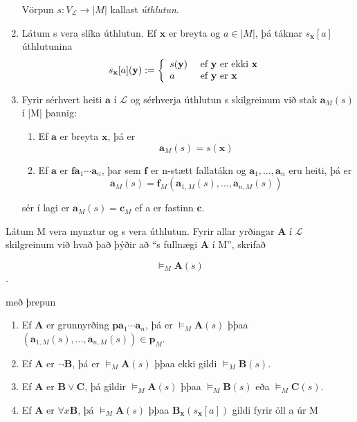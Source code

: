 \documentclass[12pt]{book}
\begin{document}
\begin{skgr}
\begin{enumerate}[(1)]
    Vörpun $s: V_{\mathcal{L}} \rightarrow |M|$ kallast \emph{úthlutun}.
  \item Látum s vera slíka úthlutun. Ef $\mathbf{x}$ er breyta og $a \in |M|$, þá táknar
    $s_{\mathbf{x}}[a]$ úthlutunina
    \[s_{\mathbf{x}}[a](\mathbf{y}) := \left\{ \begin{array}{l l} s(\mathbf{y}) & \text{ ef $\mathbf{y}$ er ekki $\mathbf{x}$ } \\ a & \text{ ef $\mathbf{y}$ er $\mathbf{x}$} \end{array} \right. \]
  \item Fyrir sérhvert heiti $\mathbf{a}$ í $\mathcal{L}$ og sérhverja úthlutun s skilgreinum við stak
    $\mathbf{a}_{M}(s)$ í |M| þannig:
    \begin{enumerate}[(1)]
    \item  Ef $\mathbf{a}$ er breyta $\mathbf{x}$, þá er 
      \[ \mathbf{a}_{M}(s) = s(\mathbf{x}) \]
    \item Ef $\mathbf{a}$ er $\mathbf{f} \mathbf{a}_1 \dotsb \mathbf{a}_n$, þar sem 
      $\mathbf{f}$ er n-stætt fallatákn og $\mathbf{a}_1, \dotsc, \mathbf{a}_n$ eru heiti,
      þá er
      \[ \mathbf{a}_{M} (s) = \mathbf{f}_{M}(\mathbf{a}_{1,M}(s), \dotsc, \mathbf{a}_{n,M}(s)) \]
    \end{enumerate}
    sér í lagi er $\mathbf{a}_{M}(s) = \mathbf{c}_M$ ef a er fastinn $\mathbf{c}$.
  \end{enumerate}
\end{skgr}

\begin{skgr}
  Látum M vera mynztur og s vera úthlutun. Fyrir allar yrðingar $\mathbf{A}$ í $\mathcal{L}$ skilgreinum
við hvað það þýðir að ``s fullnægi $\mathbf{A}$ í M'', skrifað

\[ \models_{M} \mathbf{A} (s) \].

með þrepun
\begin{enumerate}[(1)]
\item  Ef $\mathbf{A}$ er grunnyrðing $\mathbf{p} \mathbf{a}_1 \dotsb \mathbf{a}_n$,
  þá er $\models_{M} \mathbf{A} (s)$ þþaa $(\mathbf{a}_{1,M}(s), \dotsc, \mathbf{a}_{n,M}(s)) \in \mathbf{p}_{M}$.
\item Ef $\mathbf{A}$ er $\lnot \mathbf{B}$, þá er $\models_{M} \mathbf{A}(s)$ þþaa ekki gildi
  $\models_{M} \mathbf{B}(s)$.
\item Ef $\mathbf{A}$ er $\mathbf{B} \vee \mathbf{C}$, þá gildir 
  $\models_{M} \mathbf{A}(s)$ þþaa $\models_{M} \mathbf{B}(s)$ eða $\models_{M} \mathbf{C}(s)$.
\item Ef $\mathbf{A}$ er $\forall x \mathbf{B}$, þá $\models_{M} \mathbf{A}(s)$ þþaa
  $\mathbf{B}_{\mathbf{x}} (s_{\mathbf{x}}[a])$ gildi fyrir öll a úr M
\end{enumerate}

\end{skgr}
\end{document}
